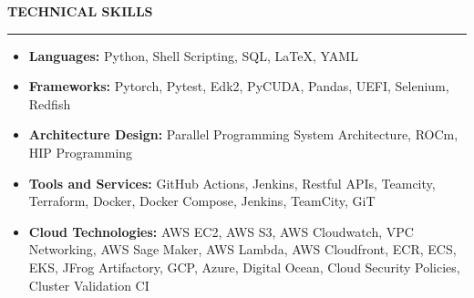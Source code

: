 \documentclass{resume} %
\renewenvironment{rSection}[1]{ %
  \sectionskip
  \textcolor{primaryColor}{\MakeUppercase{\bf #1}} %
  \sectionlineskip
  {\color{primaryColor}\hrule} %
  \begin{list}{}{ %
    \setlength{\leftmargin}{1.5em} %
  }
  \item[]
}{
  \end{list}
}
\begin{document}
\begin{rSection}{TECHNICAL SKILLS}
\if{}
\begin{itemize}
    \item \textbf{\textcolor{primaryColor}{Languages:}} Python, Shell Scripting, SQL, LaTeX, YAML
    \item \textbf{\textcolor{primaryColor}{Frameworks:}} Pytorch, Pytest, Edk2, PyCUDA, Pandas, UEFI, Selenium, Redfish
    \item \textbf{\textcolor{primaryColor}{Architecture Design:}} Parallel Programming System Architecture, ROCm, HIP Programming
    \item \textbf{\textcolor{primaryColor}{Tools and Services:}} GitHub Actions, Jenkins, Restful APIs, Teamcity, Terraform, Docker, Docker Compose, Jenkins, TeamCity, GiT
    \item \textbf{\textcolor{primaryColor}{Cloud Technologies:}} AWS EC2, AWS S3, AWS Cloudwatch, VPC Networking, AWS Sage Maker, AWS Lambda, AWS Cloudfront, ECR, ECS, EKS, JFrog Artifactory, GCP, Azure, Digital Ocean, Cloud Security Policies, Cluster Validation CI
\end{itemize}
\fi

\end{rSection}



\end{document}

